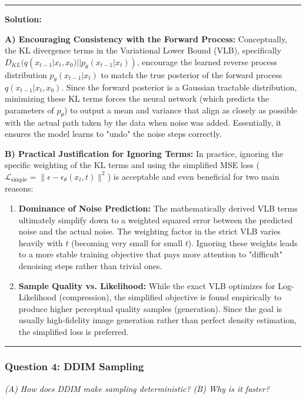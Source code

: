 \documentclass[a4paper,12pt]{article}
\newenvironment{solutionbox}{
    \par
    \vspace{0.5em}
    \noindent
    {\color{primary}\rule{\linewidth}{0.4pt}}
    \par\smallskip
    \noindent\textbf{\color{primary}Solution:}
    \par\smallskip
    \small
}{
    \par\smallskip
    {\color{primary}\rule{\linewidth}{0.4pt}}
    \par\vspace{0.5em}
}
\begin{document}
\begin{solutionbox}
    \textbf{A) Encouraging Consistency with the Forward Process:}
    Conceptually, the KL divergence terms in the Variational Lower Bound (VLB), specifically $D_{KL}(q(x_{t-1}|x_t, x_0) || p_\theta(x_{t-1}|x_t))$, encourage the learned reverse process distribution $p_\theta(x_{t-1}|x_t)$ to match the true posterior of the forward process $q(x_{t-1}|x_t, x_0)$. Since the forward posterior is a Gaussian tractable distribution, minimizing these KL terms forces the neural network (which predicts the parameters of $p_\theta$) to output a mean and variance that align as closely as possible with the actual path taken by the data when noise was added. Essentially, it ensures the model learns to "undo" the noise steps correctly.

    \textbf{B) Practical Justification for Ignoring Terms:}
    In practice, ignoring the specific weighting of the KL terms and using the simplified MSE loss ($\mathcal{L}_{\text{simple}} = \|\epsilon - \epsilon_\theta(x_t, t)\|^2$) is acceptable and even beneficial for two main reasons:
    \begin{enumerate}
        \item \textbf{Dominance of Noise Prediction:} The mathematically derived VLB terms ultimately simplify down to a weighted squared error between the predicted noise and the actual noise. The weighting factor in the strict VLB varies heavily with $t$ (becoming very small for small $t$). Ignoring these weights leads to a more stable training objective that pays more attention to "difficult" denoising steps rather than trivial ones.
        \item \textbf{Sample Quality vs. Likelihood:} While the exact VLB optimizes for Log-Likelihood (compression), the simplified objective is found empirically to produce higher perceptual quality samples (generation). Since the goal is usually high-fidelity image generation rather than perfect density estimation, the simplified loss is preferred.
    \end{enumerate}
\end{solutionbox}
\subsubsection{Question 4: DDIM Sampling}
\textit{(A) How does DDIM make sampling deterministic? (B) Why is it faster?}
\end{document}
